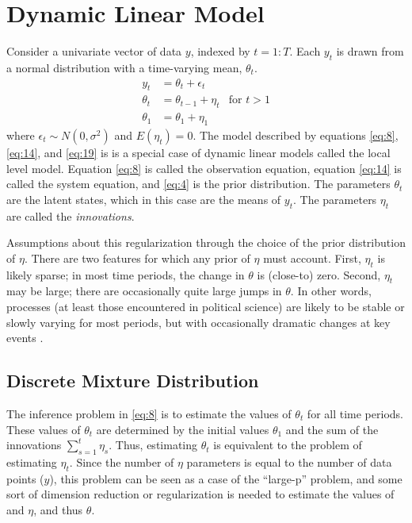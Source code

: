 \documentclass{article}
\begin{document}
\section{Dynamic Linear Model}

Consider a univariate vector of data $y$, indexed by $t = 1:T$.
Each $y_{t}$ is drawn from a normal distribution with a time-varying mean, $\theta_{t}$.
\begin{align}
  \label{eq:8}
  y_t &= \theta_t + \epsilon_t \\
  \label{eq:14}
  \theta_t &= \theta_{t-1} + \eta_{t} & \text{for $t > 1$} \\
  \label{eq:19}
  \theta_1 &= \theta_{1} + \eta_{1}
\end{align}
where $\epsilon_{t} \sim N(0, \sigma^{2})$ and $E(\eta_{t}) = 0$.
The model described by equations \eqref{eq:8}, \eqref{eq:14}, and \eqref{eq:19} is 
is a special case of dynamic linear models called the local level model.
Equation \eqref{eq:8} is called the observation equation, 
equation \eqref{eq:14} is called the system equation,
and \eqref{eq:4} is the prior distribution.
The parameters $\theta_{t}$ are the latent states, which in this case are the means of $y_{t}$.
The parameters $\eta_{t}$ are called the \textit{innovations}.

Assumptions about this regularization through the choice of the prior distribution of $\eta$.
There are two features for which any prior of $\eta$ must account.
First, $\eta_{t}$ is likely sparse; in most time periods, the change in $\theta$ is (close-to) zero.
Second, $\eta_{t}$ may be large; there are occasionally quite large jumps in $\theta$.
In other words, processes (at least those encountered in political science) are likely to be stable or slowly varying for most periods, but with occasionally dramatic changes at key events \parencite{RatkovicEng2010}.

\subsection{Discrete Mixture Distribution}
\label{sec:discr-mixt-distr}

The inference problem in \eqref{eq:8} is to estimate the values of $\theta_{t}$ for all time periods.
These values of $\theta_{t}$ are determined by the initial values $\theta_{1}$ and the sum of the innovations $\sum_{s=1}^{t} \eta_{s}$.
Thus, estimating $\theta_{t}$ is equivalent to the problem of estimating $\eta_{t}$.
Since the number of $\eta$ parameters is equal to the number of data points ($y$), this problem can be seen as a case of the ``large-p'' problem, and some sort of dimension reduction or regularization is needed to estimate the values of and $\eta$, and thus $\theta$.
\end{document}
